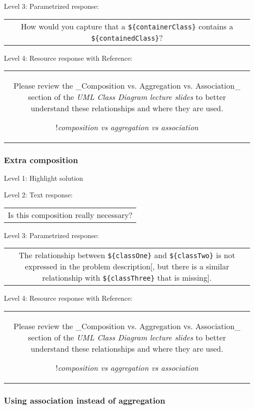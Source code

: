 \noindent Level 3: Parametrized response: \medskip

\begin{tabular}{|c}
How would you capture that a \verb|${containerClass}| contains a \verb|${containedClass}|?
\end{tabular} \medskip

\noindent Level 4: Resource response with Reference:

\begin{tabular}{|c}
Please review the _Composition vs. Aggregation vs. Association_ section of 
the \textit{UML Class Diagram lecture slides} to 
better understand these relationships and where they are used.

!\textit{composition vs aggregation vs association}
\end{tabular} \medskip


\subsubsection{Extra composition}

\noindent Level 1: Highlight solution \medskip

\noindent Level 2: Text response: \medskip

\begin{tabular}{|c}
Is this composition really necessary?
\end{tabular} \medskip

\noindent Level 3: Parametrized response: \medskip

\begin{tabular}{|c}
The relationship between \verb|${classOne}| and \verb|${classTwo}| is not expressed in the problem description[, but there is a similar relationship with \verb|${classThree}| that is missing].
\end{tabular} \medskip

\noindent Level 4: Resource response with Reference:

\begin{tabular}{|c}
Please review the _Composition vs. Aggregation vs. Association_ section of 
the \textit{UML Class Diagram lecture slides} to 
better understand these relationships and where they are used.

!\textit{composition vs aggregation vs association}
\end{tabular} \medskip


\subsubsection{Using association instead of aggregation}

